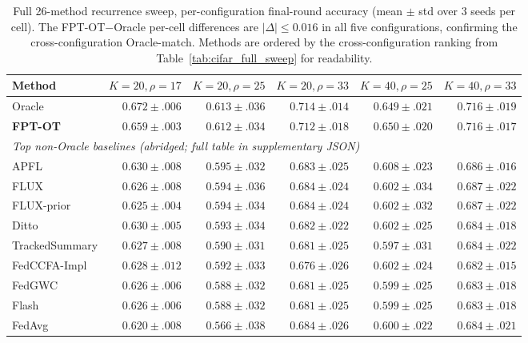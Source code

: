 \begin{table}[h]
\centering
\caption{Full 26-method recurrence sweep, per-configuration final-round accuracy (mean $\pm$ std over 3 seeds per cell). The FPT-OT$-$Oracle per-cell differences are $|\Delta| \le 0.016$ in all five configurations, confirming the cross-configuration Oracle-match. Methods are ordered by the cross-configuration ranking from Table~\ref{tab:cifar_full_sweep} for readability.}
\label{tab:cifar_full_percfg}
\scriptsize
\setlength{\tabcolsep}{3pt}
\begin{tabular}{lrrrrr}
\toprule
Method & $K{=}20,\rho{=}17$ & $K{=}20,\rho{=}25$ & $K{=}20,\rho{=}33$ & $K{=}40,\rho{=}25$ & $K{=}40,\rho{=}33$ \\
\midrule
Oracle            & $0.672 \pm .006$ & $0.613 \pm .036$ & $0.714 \pm .014$ & $0.649 \pm .021$ & $0.716 \pm .019$ \\
\textbf{FPT-OT}   & $\mathbf{0.659 \pm .003}$ & $\mathbf{0.612 \pm .034}$ & $\mathbf{0.712 \pm .018}$ & $\mathbf{0.650 \pm .020}$ & $\mathbf{0.716 \pm .017}$ \\
\midrule
\multicolumn{6}{l}{\emph{Top non-Oracle baselines (abridged; full table in supplementary JSON)}} \\
APFL              & $0.630 \pm .008$ & $0.595 \pm .032$ & $0.683 \pm .025$ & $0.608 \pm .023$ & $0.686 \pm .016$ \\
FLUX              & $0.626 \pm .008$ & $0.594 \pm .036$ & $0.684 \pm .024$ & $0.602 \pm .034$ & $0.687 \pm .022$ \\
FLUX-prior        & $0.625 \pm .004$ & $0.594 \pm .034$ & $0.684 \pm .024$ & $0.602 \pm .032$ & $0.687 \pm .022$ \\
Ditto             & $0.630 \pm .005$ & $0.593 \pm .034$ & $0.682 \pm .022$ & $0.602 \pm .025$ & $0.684 \pm .018$ \\
TrackedSummary    & $0.627 \pm .008$ & $0.590 \pm .031$ & $0.681 \pm .025$ & $0.597 \pm .031$ & $0.684 \pm .022$ \\
FedCCFA-Impl      & $0.628 \pm .012$ & $0.592 \pm .033$ & $0.676 \pm .026$ & $0.602 \pm .024$ & $0.682 \pm .015$ \\
FedGWC            & $0.626 \pm .006$ & $0.588 \pm .032$ & $0.681 \pm .025$ & $0.599 \pm .025$ & $0.683 \pm .018$ \\
Flash             & $0.626 \pm .006$ & $0.588 \pm .032$ & $0.681 \pm .025$ & $0.599 \pm .025$ & $0.683 \pm .018$ \\
FedAvg            & $0.620 \pm .008$ & $0.566 \pm .038$ & $0.684 \pm .026$ & $0.600 \pm .022$ & $0.684 \pm .021$ \\

\end{tabular}
\end{table}
